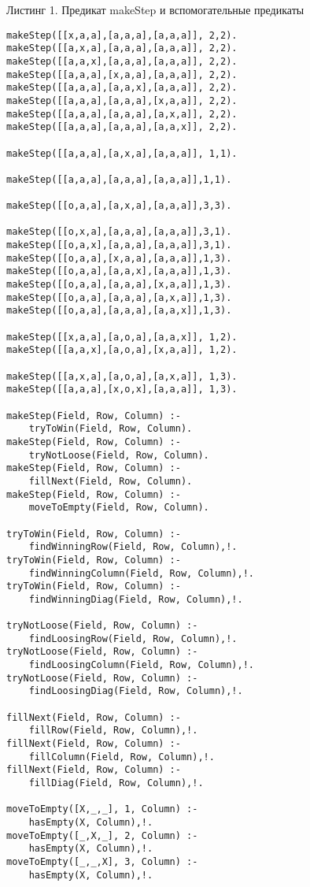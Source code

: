 \documentclass{article}
\begin{document}
\noindent Листинг 1. Предикат makeStep и вспомогательные предикаты
\begin{lstlisting}
makeStep([[x,a,a],[a,a,a],[a,a,a]], 2,2).
makeStep([[a,x,a],[a,a,a],[a,a,a]], 2,2).
makeStep([[a,a,x],[a,a,a],[a,a,a]], 2,2).
makeStep([[a,a,a],[x,a,a],[a,a,a]], 2,2).
makeStep([[a,a,a],[a,a,x],[a,a,a]], 2,2).
makeStep([[a,a,a],[a,a,a],[x,a,a]], 2,2).
makeStep([[a,a,a],[a,a,a],[a,x,a]], 2,2).
makeStep([[a,a,a],[a,a,a],[a,a,x]], 2,2).

makeStep([[a,a,a],[a,x,a],[a,a,a]], 1,1).

makeStep([[a,a,a],[a,a,a],[a,a,a]],1,1).

makeStep([[o,a,a],[a,x,a],[a,a,a]],3,3).

makeStep([[o,x,a],[a,a,a],[a,a,a]],3,1).
makeStep([[o,a,x],[a,a,a],[a,a,a]],3,1).
makeStep([[o,a,a],[x,a,a],[a,a,a]],1,3).
makeStep([[o,a,a],[a,a,x],[a,a,a]],1,3).
makeStep([[o,a,a],[a,a,a],[x,a,a]],1,3).
makeStep([[o,a,a],[a,a,a],[a,x,a]],1,3).
makeStep([[o,a,a],[a,a,a],[a,a,x]],1,3).

makeStep([[x,a,a],[a,o,a],[a,a,x]], 1,2).
makeStep([[a,a,x],[a,o,a],[x,a,a]], 1,2).

makeStep([[a,x,a],[a,o,a],[a,x,a]], 1,3).
makeStep([[a,a,a],[x,o,x],[a,a,a]], 1,3).

makeStep(Field, Row, Column) :-
    tryToWin(Field, Row, Column).
makeStep(Field, Row, Column) :-
    tryNotLoose(Field, Row, Column).
makeStep(Field, Row, Column) :-
    fillNext(Field, Row, Column).
makeStep(Field, Row, Column) :-
    moveToEmpty(Field, Row, Column).

tryToWin(Field, Row, Column) :-
    findWinningRow(Field, Row, Column),!.
tryToWin(Field, Row, Column) :-
    findWinningColumn(Field, Row, Column),!.
tryToWin(Field, Row, Column) :-
    findWinningDiag(Field, Row, Column),!.

tryNotLoose(Field, Row, Column) :-
    findLoosingRow(Field, Row, Column),!.
tryNotLoose(Field, Row, Column) :-
    findLoosingColumn(Field, Row, Column),!.
tryNotLoose(Field, Row, Column) :-
    findLoosingDiag(Field, Row, Column),!.

fillNext(Field, Row, Column) :-
    fillRow(Field, Row, Column),!.
fillNext(Field, Row, Column) :-
    fillColumn(Field, Row, Column),!.
fillNext(Field, Row, Column) :-
    fillDiag(Field, Row, Column),!.

moveToEmpty([X,_,_], 1, Column) :-
    hasEmpty(X, Column),!.
moveToEmpty([_,X,_], 2, Column) :-
    hasEmpty(X, Column),!.
moveToEmpty([_,_,X], 3, Column) :-
    hasEmpty(X, Column),!.


\end{lstlisting}
\end{document}
